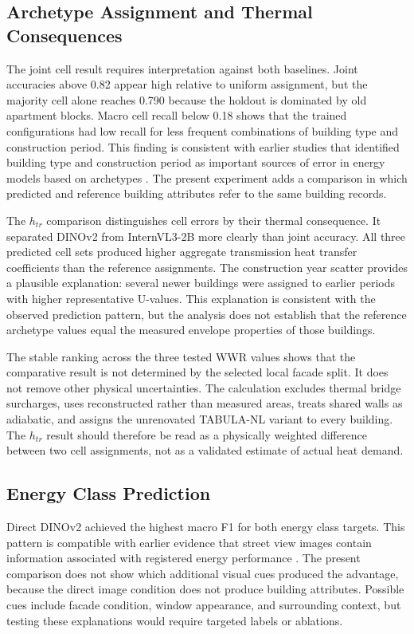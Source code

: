 \subsection{Archetype Assignment and Thermal Consequences}

The joint cell result requires interpretation against both baselines. Joint accuracies above 0.82 appear high relative to uniform assignment, but the majority cell alone reaches 0.790 because the holdout is dominated by old apartment blocks. Macro cell recall below 0.18 shows that the trained configurations had low recall for less frequent combinations of building type and construction period. This finding is consistent with earlier studies that identified building type and construction period as important sources of error in energy models based on archetypes \parencite{dochev2020,bass2022}. The present experiment adds a comparison in which predicted and reference building attributes refer to the same building records.

The $h_{tr}$ comparison distinguishes cell errors by their thermal consequence. It separated DINOv2 from InternVL3-2B more clearly than joint accuracy. All three predicted cell sets produced higher aggregate transmission heat transfer coefficients than the reference assignments. The construction year scatter provides a plausible explanation: several newer buildings were assigned to earlier periods with higher representative U-values. This explanation is consistent with the observed prediction pattern, but the analysis does not establish that the reference archetype values equal the measured envelope properties of those buildings.

The stable ranking across the three tested WWR values shows that the comparative result is not determined by the selected local facade split. It does not remove other physical uncertainties. The calculation excludes thermal bridge surcharges, uses reconstructed rather than measured areas, treats shared walls as adiabatic, and assigns the unrenovated TABULA-NL variant to every building. The $h_{tr}$ result should therefore be read as a physically weighted difference between two cell assignments, not as a validated estimate of actual heat demand.

\subsection{Energy Class Prediction}

Direct DINOv2 achieved the highest macro F1 for both energy class targets. This pattern is compatible with earlier evidence that street view images contain information associated with registered energy performance \parencite{mayer2023uk,mayer2023dk}. The present comparison does not show which additional visual cues produced the advantage, because the direct image condition does not produce building attributes. Possible cues include facade condition, window appearance, and surrounding context, but testing these explanations would require targeted labels or ablations.

